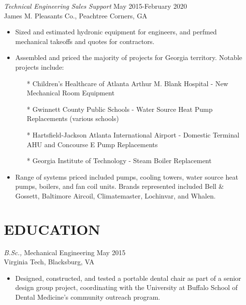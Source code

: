 \documentclass[margin]{res}
\begin{document}
\begin{resume}
    {\sl Technical Engineering Sales Support} \hfill May 2015-February 2020 \\
        James M. Pleasants Co., Peachtree Corners, GA
        \begin{itemize}  \itemsep -2pt %
            \item Sized and estimated hydronic equipment for engineers, and perfmed mechanical takeoffs and quotes for contractors.
            \item Assembled and priced the majority of projects for Georgia territory. Notable projects include:
              \begin{itemize}
              \item[*] Children's Healthcare of Atlanta Arthur M. Blank Hospital - New Mechanical Room Equipment
              \item[*] Gwinnett County Public Schools - Water Source Heat Pump Replacements (various schools)
              \item[*] Hartsfield-Jackson Atlanta International Airport - Domestic Terminal AHU and Concourse E Pump Replacements
              \item[*] Georgia Institute of Technology - Steam Boiler Replacement
              \end{itemize}
            \item Range of systems priced included pumps, cooling towers, water source heat pumps, boilers, and fan coil units. Brands represented included Bell \& Gossett, Baltimore Aircoil, Climatemaster, Lochinvar, and Whalen.
            \end{itemize}
 

\section{EDUCATION} {\sl B.Sc.,} Mechanical Engineering \hfill  May 2015 \\
    Virginia Tech, Blacksburg, VA
    \begin{itemize}  \itemsep -2pt %
        \item Designed, constructed, and tested a portable dental chair as part of a senior design group project, coordinating with the University at Buffalo School of Dental Medicine's community outreach program.
    \end{itemize}


\end{resume}
\end{document}
